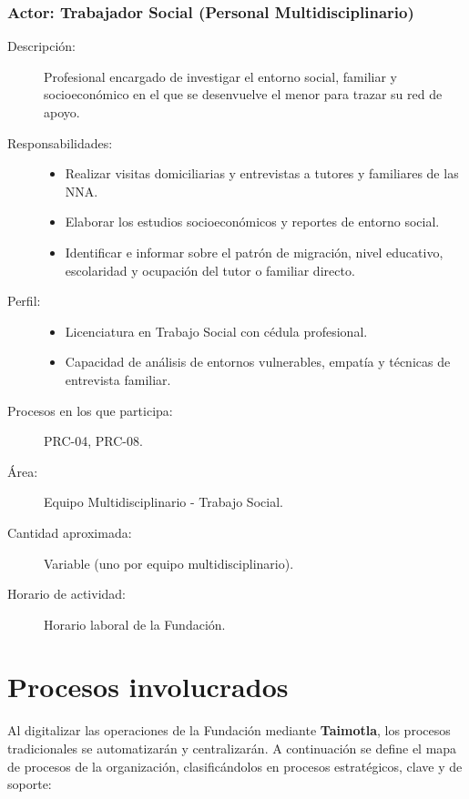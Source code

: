 \subsubsection{Actor: Trabajador Social (Personal Multidisciplinario)}
\begin{description}
	\item[Descripción:] Profesional encargado de investigar el entorno social, familiar y socioeconómico en el que se desenvuelve el menor para trazar su red de apoyo.
	\item[Responsabilidades:] \cdtEmpty
		\begin{itemize}
			\item Realizar visitas domiciliarias y entrevistas a tutores y familiares de las NNA.
			\item Elaborar los estudios socioeconómicos y reportes de entorno social.
			\item Identificar e informar sobre el patrón de migración, nivel educativo, escolaridad y ocupación del tutor o familiar directo.
		\end{itemize}
	\item[Perfil:] \cdtEmpty
		\begin{itemize}
			\item Licenciatura en Trabajo Social con cédula profesional.
			\item Capacidad de análisis de entornos vulnerables, empatía y técnicas de entrevista familiar.
		\end{itemize}
	\item[Procesos en los que participa:] PRC-04, PRC-08.
	\item[Área:] Equipo Multidisciplinario - Trabajo Social.
	\item[Cantidad aproximada:] Variable (uno por equipo multidisciplinario).
	\item[Horario de actividad:] Horario laboral de la Fundación.
\end{description}


\section{Procesos involucrados}

Al digitalizar las operaciones de la Fundación mediante \textbf{Taimotla}, los procesos tradicionales se automatizarán y centralizarán. A continuación se define el mapa de procesos de la organización, clasificándolos en procesos estratégicos, clave y de soporte:

